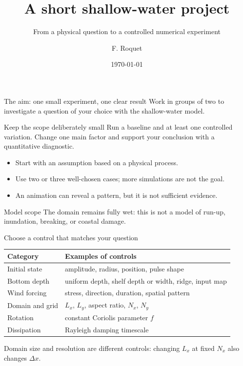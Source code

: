 \documentclass[aspectratio=169]{beamer}
\title[Shallow-water project]{A short shallow-water project}
\subtitle{From a physical question to a controlled numerical experiment}
\author{F. Roquet}
\date{\today}
\begin{document}
\begin{frame}
  \titlepage
\end{frame}

\begin{frame}{The aim: one small experiment, one clear result}
  Work in groups of two to investigate a question of your choice with
  the shallow-water model.
  \begin{block}{Keep the scope deliberately small}
    Run a baseline and at least one controlled variation. Change one main
    factor and support your conclusion with a quantitative diagnostic.
  \end{block}
  \begin{itemize}
    \item Start with an assumption based on a physical process.
    \item Use two or three well-chosen cases; more simulations are not the goal.
    \item An animation can reveal a pattern, but it is not sufficient evidence.
  \end{itemize}
  \begin{alertblock}{Model scope}
    The domain remains fully wet: this is not a model of run-up, inundation,
    breaking, or coastal damage.
  \end{alertblock}
\end{frame}

\begin{frame}{Choose a control that matches your question}
  \begin{center}
  \begin{tabular}{p{}p{}}
    \toprule
    \textbf{Category} & \textbf{Examples of controls} \\
    \midrule
    Initial state & amplitude, radius, position, pulse shape \\
    Bottom depth & uniform depth, shelf depth or width, ridge, input map \\
    Wind forcing & stress, direction, duration, spatial pattern \\
    Domain and grid & $L_x$, $L_y$, aspect ratio, $N_x$, $N_y$ \\
    Rotation & constant Coriolis parameter $f$ \\
    Dissipation & Rayleigh damping timescale \\
    \bottomrule
  \end{tabular}
  \end{center}
  \vfill
  Domain size and resolution are different controls: changing $L_x$ at fixed
  $N_x$ also changes $\Delta x$.
\end{frame}
\end{document}

